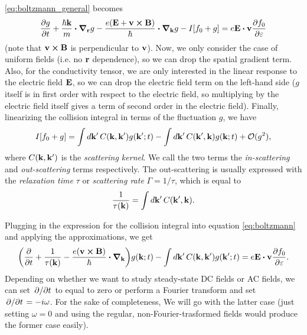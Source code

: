 \documentclass[12pt]{article}
\begin{document}
\eqref{eq:boltzmann_general} becomes
\begin{equation}
    \pdv{g}{t} + \frac{\hbar\vb{k}}{m}\vdot\grad_{\vb{r}} g
    - \frac{e(\vb{E} + \vb{v}\cross\vb{B})}{\hbar}\vdot\grad_{\vb{k}}g - I[f_0 + g]
    = e\vb{E}\vdot\vb{v}\pdv{f_0}{\varepsilon} \label{eq:boltzmann}
\end{equation}
(note that $\vb{v}\cross\vb{B}$ is perpendicular to $\vb{v}$). Now, we only consider the case of
uniform fields (i.e. no $\vb{r}$ dependence), so we can drop the spatial gradient term. Also, for
the conductivity tensor, we are only interested in the linear response to the electric field
$\vb{E}$, so we can drop the electric field term on the left-hand side ($g$ itself is in first order
with respect to the electric field, so multiplying by the electric field itself gives a term of
second order in the electric field). Finally, linearizing the collision integral in terms of the
fluctuation $g$, we have
\begin{equation}
    I[f_0 + g] = \int\dd{\vb{k'}} C(\vb{k}, \vb{k'}) g(\vb{k'}; t)
    - \int\dd{\vb{k'}} C(\vb{k'}, \vb{k}) g(\vb{k}; t) + \mathcal{O}(g^2),
\end{equation} 
where $C(\vb{k}, \vb{k'})$ is the \emph{scattering kernel}. We call the two terms the
\emph{in-scattering} and \emph{out-scattering} terms respectively. The out-scattering is usually
expressed with the \emph{relaxation time} $\tau$ or \emph{scattering rate} $\Gamma=1/\tau$, which
is equal to
\begin{equation}
    \frac{1}{\tau(\vb{k})} = \int\dd{\vb{k'}} C(\vb{k'}, \vb{k}).
    \label{eq:tau_kernel}
\end{equation}

Plugging in the expression for the collision integral into equation \eqref{eq:boltzmann} and
applying the approximations, we get
\begin{equation}
    \qty(\pdv{t} + \frac{1}{\tau(\vb{k})} - \frac{e(\vb{v}\cross\vb{B})}{\hbar}\vdot\grad_{\vb{k}})
    g(\vb{k}; t) - \int\dd{\vb{k'}} C(\vb{k}, \vb{k'}) g(\vb{k'}; t)
    = e\vb{E}\vdot\vb{v}\pdv{f_0}{\varepsilon}.
\end{equation}
Depending on whether we want to study steady-state DC fields or AC fields, we can set $\pdv*{t}$ to
equal to zero or perform a Fourier transform and set $\pdv*{t} = -i\omega$. For the sake of
completeness, We will go with the latter case (just setting $\omega=0$ and using the regular,
non-Fourier-trasformed fields would produce the former case easily).
\end{document}
